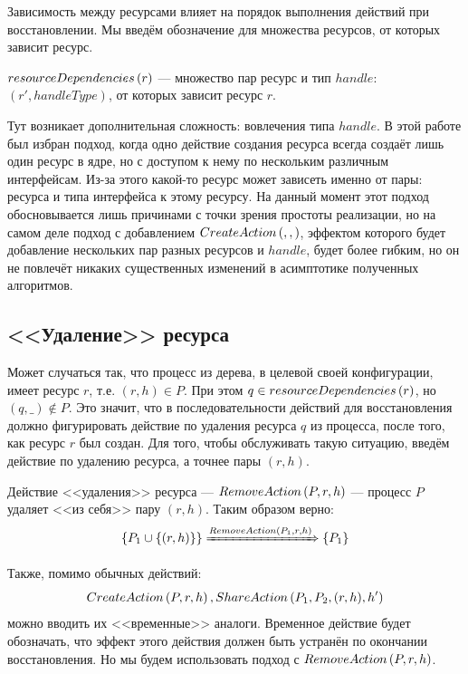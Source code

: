 Зависимость между ресурсами влияет на порядок выполнения действий при восстановлении. Мы введём обозначение для множества ресурсов, от которых зависит ресурс.

\begin{defn}
\label{def:dependsprop}
$resourceDependencies\left( r \right)$ --- множество пар ресурс и тип $handle$: \\$(r', handleType)$, от которых зависит ресурс $r$.
\end{defn}

Тут возникает дополнительная сложность: вовлечения типа $handle$. В этой работе был избран подход, когда одно действие
создания ресурса всегда создаёт лишь один ресурс в ядре, но с доступом к нему по нескольким различным интерфейсам.
Из-за этого какой-то ресурс может зависеть именно от пары: ресурса и типа интерфейса к этому ресурсу. На данный момент этот подход обосновывается лишь причинами с точки зрения простоты реализации, но на самом деле подход с добавлением 
$CreateAction\left( , ,  \right)$, эффектом которого будет добавление нескольких пар разных ресурсов и $handle$, будет более гибким, но он не повлечёт никаких существенных изменений в асимптотике полученных алгоритмов.

\subsection{<<Удаление>> ресурса}

Может случаться так, что процесс из дерева, в целевой своей конфигурации, имеет ресурс $r$, т.е. $(r, h) \in P$. При этом $q \in resourceDependencies\left( r \right)$, но $(q, \_) \notin P$. Это значит, что в последовательности действий для восстановления должно фигурировать действие по удаления ресурса $q$ из процесса, после того, как ресурс $r$ был создан. Для того, чтобы обслуживать такую ситуацию, введём действие по удалению ресурса, а точнее пары $(r, h)$.

\begin{defn}
\label{def:removeact}
Действие <<удаления>> ресурса --- $RemoveAction\left( P, r, h \right)$ --- процесс $P$ удаляет <<из себя>> пару $(r, h)$. Таким образом верно:
\begin{equation*}
	\left\lbrace P_1 \cup \left\lbrace (r, h) \right\rbrace \right\rbrace \xRightarrow{RemoveAction\left( P_1, r, h \right)} \left\lbrace P_1 \right\rbrace
\end{equation*}
\end{defn}

\begin{note}
Также, помимо обычных действий: 
\begin{equation*}
CreateAction\left( P, r, h \right), ShareAction\left( P_1, P_2, (r, h), h' \right)
\end{equation*}
можно вводить их <<временные>> аналоги. Временное действие будет обозначать, что эффект этого действия должен быть устранён по окончании восстановления. Но мы будем использовать подход с $RemoveAction\left( P, r, h \right)$.
\end{note}

